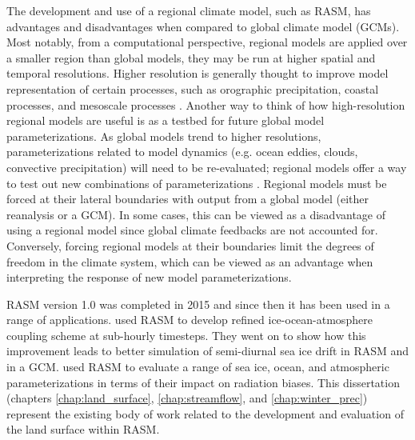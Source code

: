 The development and use of a regional climate model, such as RASM, has advantages and disadvantages when compared to global climate model (GCMs).
Most notably, from a computational perspective, regional models are applied over a smaller region than global models, they may be run at higher spatial and temporal resolutions.
Higher resolution is generally thought to improve model representation of certain processes, such as orographic precipitation, coastal processes, and mesoscale processes \citep{Feser_2011}.
Another way to think of how high-resolution regional models are useful is as a testbed for future global model parameterizations.
As global models trend to higher resolutions, parameterizations related to model dynamics (e.g. ocean eddies, clouds, convective precipitation) will need to be re-evaluated; regional models offer a way to test out new combinations of parameterizations \citep[e.g. ][]{Roberts_2015a,Cassano_2016}.
Regional models must be forced at their lateral boundaries with output from a global model (either reanalysis or a GCM).
In some cases, this can be viewed as a disadvantage of using a regional model since global climate feedbacks are not accounted for.
Conversely, forcing regional models at their boundaries limit the degrees of freedom in the climate system, which can be viewed as an advantage when interpreting the response of new model parameterizations.

RASM version 1.0 was completed in 2015 and since then it has been used in a range of applications.
\citet{Roberts_2015a} used RASM to develop refined ice-ocean-atmosphere coupling scheme at sub-hourly timesteps.
They went on to show how this improvement leads to better simulation of semi-diurnal sea ice drift in RASM and in a GCM.
\citet{Cassano_2016} used RASM to evaluate a range of sea ice, ocean, and atmospheric parameterizations in terms of their impact on radiation biases.
This dissertation (chapters \ref{chap:land_surface}, \ref{chap:streamflow}, and \ref{chap:winter_prec}) represent the existing body of work related to the development and evaluation of the land surface within RASM.
